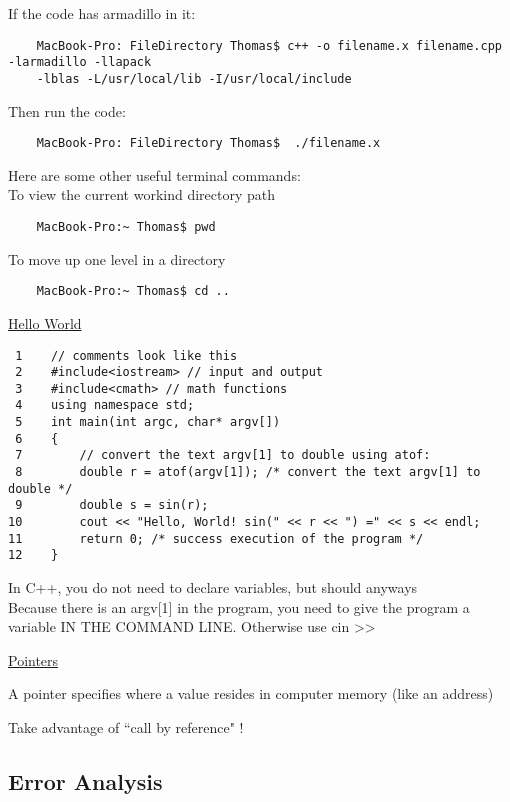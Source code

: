 \documentclass[10pt]{article} %
\begin{document}
If the code has armadillo in it:
\begin{verbatim}
    MacBook-Pro: FileDirectory Thomas$ c++ -o filename.x filename.cpp -larmadillo -llapack 
    -lblas -L/usr/local/lib -I/usr/local/include 
\end{verbatim}

Then run the code:
\begin{verbatim}
    MacBook-Pro: FileDirectory Thomas$  ./filename.x
\end{verbatim}

Here are some other useful terminal commands: \\
To view the current workind directory path
\begin{verbatim}
    MacBook-Pro:~ Thomas$ pwd
\end{verbatim}
To move up one level in a directory
\begin{verbatim}
    MacBook-Pro:~ Thomas$ cd ..
\end{verbatim}

\pagebreak

\underline{Hello World}

\begin{lstlisting}
 1    // comments look like this
 2    #include<iostream> // input and output
 3    #include<cmath> // math functions
 4    using namespace std;
 5    int main(int argc, char* argv[])
 6    {
 7        // convert the text argv[1] to double using atof:
 8        double r = atof(argv[1]); /* convert the text argv[1] to double */
 9        double s = sin(r);
10        cout << "Hello, World! sin(" << r << ") =" << s << endl;
11        return 0; /* success execution of the program */
12    }
\end{lstlisting}

In C++, you do not need to declare variables, but should anyways \\ \hspace{.4cm} Because there is an argv[1] in the program, you need to give the program a variable IN THE COMMAND LINE. Otherwise use cin >>

\underline{Pointers}

A pointer specifies where a value resides in computer memory (like an address)

Take advantage of ``call by reference" !

\subsection{Error Analysis}
\end{document}
